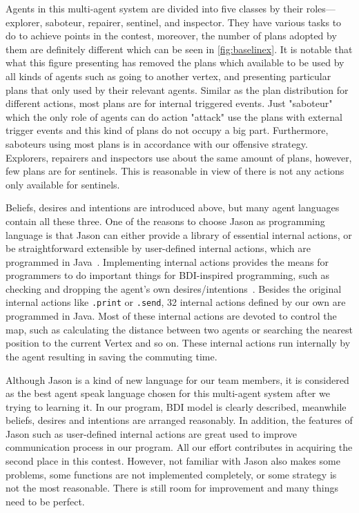 Agents in this multi-agent system are divided into five classes by their roles---explorer, saboteur, repairer, sentinel, and inspector.
They have various tasks to do to achieve points in the contest, moreover, the number of plans adopted by them are definitely different which can be seen in \autoref{fig:baselinex}.
It is notable that what this figure presenting has removed the plans which available to be used by all kinds of agents such as going to another vertex, and presenting particular plans that only used by their relevant agents.
Similar as the plan distribution for different actions, most plans are for internal triggered events.
Just "saboteur" which the only role of agents can do action "attack" use the plans with external trigger events and this kind of plans do not occupy a big part.
Furthermore, saboteurs using most plans is in accordance with our offensive strategy.
Explorers, repairers and inspectors use about the same amount of plans, however, few plans are for sentinels.
This is reasonable in view of there is not any actions only available for sentinels.

Beliefs, desires and intentions are introduced above, but many agent languages contain all these three.
One of the reasons to choose Jason as programming language is that Jason can either provide a library of essential internal actions, or be straightforward extensible by user-defined internal actions, which are programmed in Java~\cite{rafael_Javabased_2007}.
Implementing internal actions provides the means for programmers to do important things for BDI-inspired programming, such as checking and dropping the agent's own
desires/intentions~\cite{rafael_overviewjason_2006}.
Besides the original internal actions like \texttt{.print} or \texttt{.send}, 32 internal actions defined by our own are programmed in Java.
Most of these internal actions are devoted to control the map, such as calculating the distance between two agents or searching the nearest position to the current Vertex and so on.
These internal actions run internally by the agent resulting in saving the commuting time.

Although Jason is a kind of new language for our team members, it is considered as the best agent speak language chosen for this multi-agent system after we trying to learning it.
In our program, BDI model is clearly described, meanwhile beliefs, desires and intentions are arranged reasonably.
In addition, the features of Jason such as user-defined internal actions are great used to improve communication process in our program.
All our effort contributes in acquiring the second place in this contest.
However, not familiar with Jason also makes some problems, some functions are not implemented completely, or some strategy is not the most reasonable.
There is still room for improvement and many things need to be perfect.
